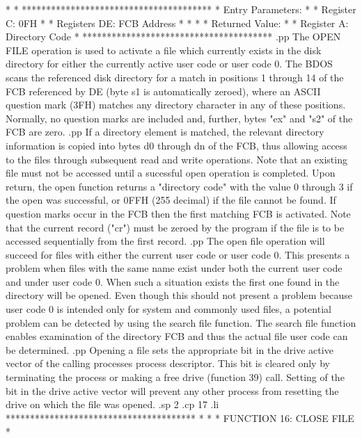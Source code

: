 *                                     *
***************************************
*  Entry Parameters:                  *
*      Register   C:  0FH             *
*      Registers DE:  FCB Address     *
*                                     *
*  Returned   Value:                  *
*      Register   A:  Directory Code  *
***************************************
.pp
The OPEN FILE operation is used to activate a file which
currently exists in the disk directory for either the currently
active user code or user code 0.  The BDOS scans the referenced disk
directory for a match in positions 1 through 14 of the
FCB referenced by DE (byte s1 is automatically zeroed),
where an ASCII question mark (3FH) matches any directory
character in any of these positions.  Normally, no
question marks are included and, further, bytes "ex" and
"s2" of the FCB are zero.
.pp
If a directory element is matched, the relevant directory
information is copied into bytes d0 through dn of the FCB,
thus allowing access to the files through subsequent read
and write operations.  Note that an existing file must not
be accessed until a sucessful open operation is completed.
Upon return, the open function returns a "directory code"
with the value 0 through 3 if the open was successful, or
0FFH (255 decimal) if the file cannot be found.  If
question marks occur in the FCB then the first matching
FCB is activated.
Note that the current record ("cr") must be zeroed by
the program if the file is to be accessed sequentially
from the first record.
.pp
The open file operation will succeed for files with either the
current user code or user code 0.  This presents a problem when
files with the same name exist under both the current user code
and under user code 0.  When such a situation exists the first one
found in the directory will be opened.  Even though this should
not present a problem because user code 0 is intended only for
system and commonly used files, a potential problem can be
detected by using the search file function.  The search file
function enables examination of the directory FCB and thus the
actual file user code can be determined.
.pp
Opening a file sets the appropriate bit in the drive active vector
of the calling processes process descriptor.  This bit is cleared
only by terminating the process or making a free drive (function 39)
call.  Setting of the bit in the drive active vector will prevent
any other process from resetting the drive on which the file was
opened.
.sp 2
.cp 17
.li
***************************************
*                                     *
*  FUNCTION 16: CLOSE FILE            *
